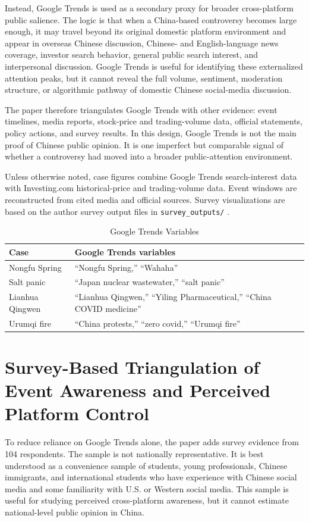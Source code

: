 \documentclass[conference]{IEEEtran}
\begin{document}
Instead, Google Trends is used as a secondary proxy for broader cross-platform public salience. The logic is that when a China-based controversy becomes large enough, it may travel beyond its original domestic platform environment and appear in overseas Chinese discussion, Chinese- and English-language news coverage, investor search behavior, general public search interest, and interpersonal discussion. Google Trends is useful for identifying these externalized attention peaks, but it cannot reveal the full volume, sentiment, moderation structure, or algorithmic pathway of domestic Chinese social-media discussion.

The paper therefore triangulates Google Trends with other evidence: event timelines, media reports, stock-price and trading-volume data, official statements, policy actions, and survey results. In this design, Google Trends is not the main proof of Chinese public opinion. It is one imperfect but comparable signal of whether a controversy had moved into a broader public-attention environment.

Unless otherwise noted, case figures combine Google Trends search-interest data with Investing.com historical-price and trading-volume data. Event windows are reconstructed from cited media and official sources. Survey visualizations are based on the author survey output files in \texttt{survey\_outputs/} \cite{googletrendsfaq,investinghistorical}.

\begin{table}[!t]
\centering
\caption{Google Trends Variables}
\label{tab:trends_variables}
\footnotesize
\begin{tabular}{p{}p{}}
\toprule
Case & Google Trends variables \\
\midrule
Nongfu Spring & ``Nongfu Spring,'' ``Wahaha'' \\
Salt panic & ``Japan nuclear wastewater,'' ``salt panic'' \\
Lianhua Qingwen & ``Lianhua Qingwen,'' ``Yiling Pharmaceutical,'' ``China COVID medicine'' \\
Urumqi fire & ``China protests,'' ``zero covid,'' ``Urumqi fire'' \\
\bottomrule
\end{tabular}
\end{table}
\FloatBarrier

\section{Survey-Based Triangulation of Event Awareness and Perceived Platform Control}
To reduce reliance on Google Trends alone, the paper adds survey evidence from 104 respondents. The sample is not nationally representative. It is best understood as a convenience sample of students, young professionals, Chinese immigrants, and international students who have experience with Chinese social media and some familiarity with U.S. or Western social media. This sample is useful for studying perceived cross-platform awareness, but it cannot estimate national-level public opinion in China.
\end{document}
